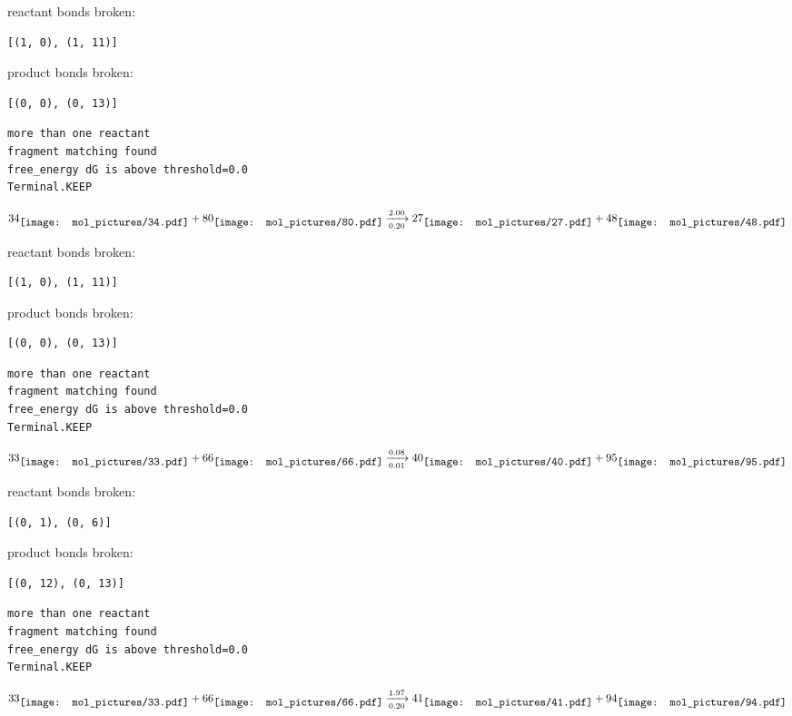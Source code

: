 \documentclass{article}
\begin{document}
reactant bonds broken:\begin{verbatim}
[(1, 0), (1, 11)]
\end{verbatim}
product bonds broken:\begin{verbatim}
[(0, 0), (0, 13)]
\end{verbatim}




\vspace{1cm}
\begin{verbatim}
more than one reactant
fragment matching found
free_energy dG is above threshold=0.0
Terminal.KEEP
\end{verbatim}
$$
34
\raisebox{-.5\height}{\texttt{[image: mol\_pictures/34.pdf]}}
+
80
\raisebox{-.5\height}{\texttt{[image: mol\_pictures/80.pdf]}}
\xrightarrow[0.20]{2.00}
27
\raisebox{-.5\height}{\texttt{[image: mol\_pictures/27.pdf]}}
+
48
\raisebox{-.5\height}{\texttt{[image: mol\_pictures/48.pdf]}}
$$


reactant bonds broken:\begin{verbatim}
[(1, 0), (1, 11)]
\end{verbatim}
product bonds broken:\begin{verbatim}
[(0, 0), (0, 13)]
\end{verbatim}




\vspace{1cm}
\begin{verbatim}
more than one reactant
fragment matching found
free_energy dG is above threshold=0.0
Terminal.KEEP
\end{verbatim}
$$
33
\raisebox{-.5\height}{\texttt{[image: mol\_pictures/33.pdf]}}
+
66
\raisebox{-.5\height}{\texttt{[image: mol\_pictures/66.pdf]}}
\xrightarrow[0.01]{0.08}
40
\raisebox{-.5\height}{\texttt{[image: mol\_pictures/40.pdf]}}
+
95
\raisebox{-.5\height}{\texttt{[image: mol\_pictures/95.pdf]}}
$$


reactant bonds broken:\begin{verbatim}
[(0, 1), (0, 6)]
\end{verbatim}
product bonds broken:\begin{verbatim}
[(0, 12), (0, 13)]
\end{verbatim}




\vspace{1cm}
\begin{verbatim}
more than one reactant
fragment matching found
free_energy dG is above threshold=0.0
Terminal.KEEP
\end{verbatim}
$$
33
\raisebox{-.5\height}{\texttt{[image: mol\_pictures/33.pdf]}}
+
66
\raisebox{-.5\height}{\texttt{[image: mol\_pictures/66.pdf]}}
\xrightarrow[0.20]{1.97}
41
\raisebox{-.5\height}{\texttt{[image: mol\_pictures/41.pdf]}}
+
94
\raisebox{-.5\height}{\texttt{[image: mol\_pictures/94.pdf]}}
$$
\end{document}
